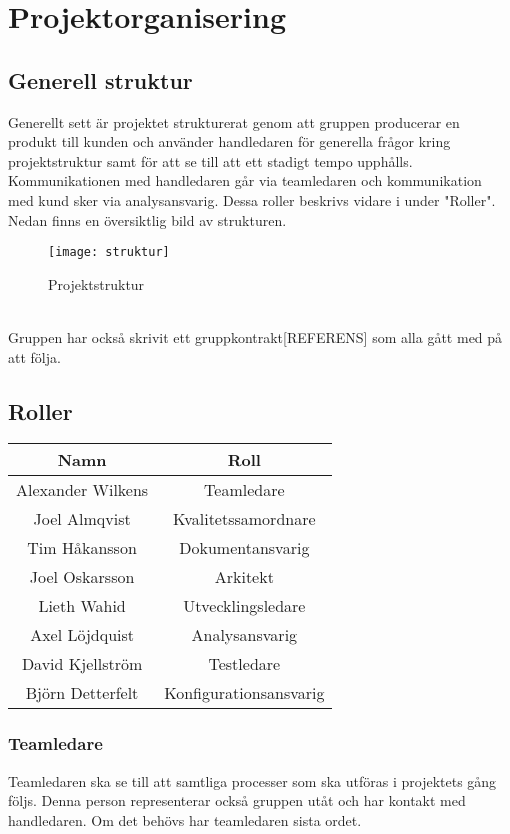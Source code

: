 \section{Projektorganisering}
\subsection{Generell struktur}
Generellt sett är projektet strukturerat genom att gruppen producerar en produkt till kunden och använder handledaren för generella frågor kring projektstruktur samt för att se till att ett stadigt tempo upphålls. Kommunikationen med handledaren går via teamledaren och kommunikation med kund sker via analysansvarig. Dessa roller beskrivs vidare i under "Roller". Nedan finns en översiktlig bild av strukturen.
\begin{figure}[h]
    \centering
    \texttt{[image: struktur]}
    \caption{Projektstruktur}
    \label{fig:struktur}
\end{figure}\\
Gruppen har också skrivit ett gruppkontrakt[REFERENS] som alla gått med på att följa.


\subsection{Roller}
\begin{center}
    \begin{tabular}{| c | c |}
        \hline
        \textbf{Namn} & \textbf{Roll} \\
        \hline
        \centering Alexander Wilkens & Teamledare\\
        \hline
        \centering Joel Almqvist & Kvalitetssamordnare\\
        \hline
        \centering Tim Håkansson & Dokumentansvarig\\
        \hline
        \centering Joel Oskarsson & Arkitekt\\
        \hline
        \centering Lieth Wahid & Utvecklingsledare\\
        \hline
        \centering Axel Löjdquist & Analysansvarig\\
        \hline
        \centering David Kjellström & Testledare\\
        \hline
        \centering Björn Detterfelt & Konfigurationsansvarig\\
        \hline
    \end{tabular}
\end{center}
\subsubsection*{Teamledare}
Teamledaren ska se till att samtliga processer som ska utföras i projektets gång följs. Denna person representerar också gruppen utåt och har kontakt med handledaren. Om det behövs har teamledaren sista ordet.

